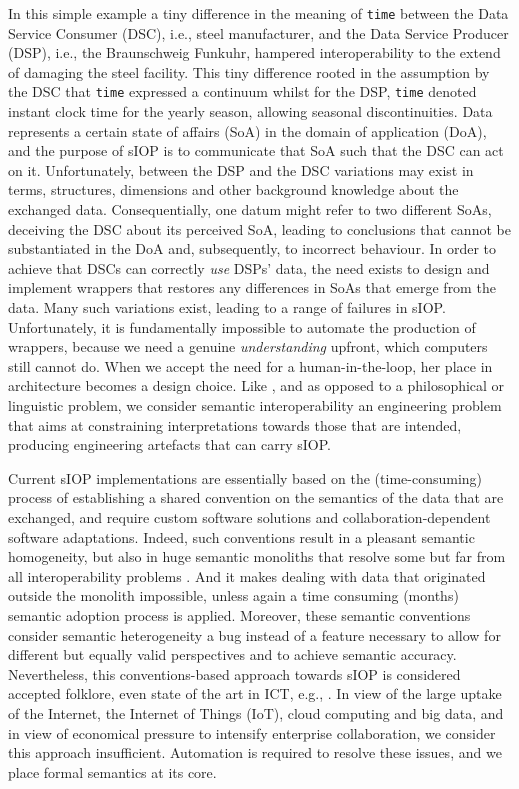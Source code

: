 \documentclass[sort&compress,preprint,authoryear,3p,twocolumn]{elsarticle}
\begin{document}
In this simple example a tiny difference in the meaning of \texttt{time}
between the Data Service Consumer (DSC), i.e., steel manufacturer, and
the Data Service Producer (DSP), i.e., the Braunschweig Funkuhr,
hampered interoperability to the extend of damaging the steel facility.
This tiny difference rooted in the assumption by the DSC that
\texttt{time} expressed a continuum whilst for the DSP, \texttt{time}
denoted instant clock time for the yearly season, allowing seasonal
discontinuities. Data represents a certain state of affairs (SoA) in the
domain of application (DoA), and the purpose of sIOP is to communicate
that SoA such that the DSC can act on it. Unfortunately, between the DSP
and the DSC variations may exist in terms, structures, dimensions and
other background knowledge about the exchanged data. Consequentially,
one datum might refer to two different SoAs, deceiving the DSC about its
perceived SoA, leading to conclusions that cannot be substantiated in
the DoA and, subsequently, to incorrect behaviour. In order to achieve
that DSCs can correctly \emph{use} DSPs' data, the need exists to design
and implement wrappers that restores any differences in SoAs that emerge
from the data. Many such variations exist, leading to a range of
failures in sIOP. Unfortunately, it is fundamentally impossible to
automate the production of wrappers, because we need a genuine
\emph{understanding} upfront, which computers still cannot do. When we
accept the need for a human-in-the-loop, her place in architecture
becomes a design choice. Like \citep{Kuhn2009}, and as opposed to a
philosophical or linguistic problem, we consider semantic
interoperability an engineering problem that aims at constraining
interpretations towards those that are intended, producing engineering
artefacts that can carry sIOP.

Current sIOP implementations are essentially based on the
(time-consuming) process of establishing a shared convention on the
semantics of the data that are exchanged, and require custom software
solutions and collaboration-dependent software adaptations. Indeed, such
conventions result in a pleasant semantic homogeneity, but also in huge
semantic monoliths that resolve some but far from all interoperability
problems \citep{Renner1996}. And it makes dealing with data that
originated outside the monolith impossible, unless again a time
consuming (months) semantic adoption process is applied. Moreover, these
semantic conventions consider semantic heterogeneity a bug instead of a
feature necessary to allow for different but equally valid perspectives
and to achieve semantic accuracy. Nevertheless, this conventions-based
approach towards sIOP is considered accepted folklore, even state of the
art in ICT, e.g., \citep{Otto2019}. In view of the large uptake of the
Internet, the Internet of Things (IoT), cloud computing and big data,
and in view of economical pressure to intensify enterprise
collaboration, we consider this approach insufficient. Automation is
required to resolve these issues, and we place formal semantics at its
core.
\end{document}
